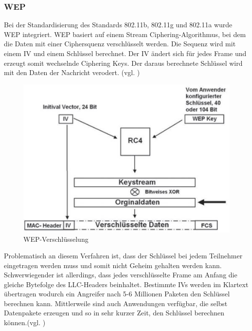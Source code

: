 \subsubsection{\ac{WEP}}
Bei der Standardisierung des Standards 802.11b, 802.11g und 802.11a wurde \ac{WEP} integriert. \ac{WEP} basiert auf einem Stream Ciphering-Algorithmus, bei dem die Daten mit einer Ciphersquenz verschlüsselt werden. Die Sequenz wird mit einem \ac{IV} und einem Schlüssel berechnet. Der \ac{IV} ändert sich für jedes Frame und erzeugt somit wechselnde Ciphering Keys. Der daraus berechnete Schlüssel wird mit den Daten der Nachricht verodert. (vgl. \cite{SWB-430171331})

\begin{figure} [htb]
\begin{centering}
\includegraphics{Bilder/wep_funktionsweise.jpg}
\caption[WEP-Verschlüsselung]{WEP-Verschlüsselung \cite{SWB-430171331}}
\label{wep_funktionsweise}
\end{centering}
\end{figure}

Problematisch an diesem Verfahren ist, dass der Schlüssel bei jedem Teilnehmer eingetragen werden muss und somit nicht Geheim gehalten werden kann. Schwerwiegender ist allerdings, dass jedes verschlüsselte Frame am Anfang die gleiche Bytefolge des \ac{LLC}-Headers beinhaltet. Bestimmte \ac{IV}s werden im Klartext übertragen wodurch ein Angreifer nach 5-6 Millionen Paketen den Schlüssel berechnen kann. Mittlerweile sind auch Anwendungen verfügbar, die selbst Datenpakete erzeugen und so in sehr kurzer Zeit, den Schlüssel berechnen können.(vgl. \cite{SWB-430171331})

